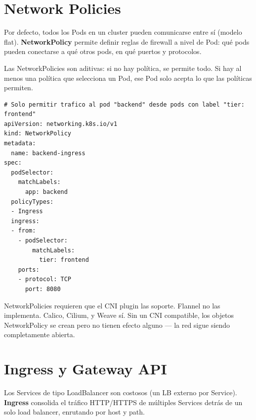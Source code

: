 \section{ Network Policies}

\begin{concepto}
Por defecto, todos los Pods en un cluster pueden comunicarse entre sí (modelo flat).
\textbf{NetworkPolicy} permite definir reglas de firewall a nivel de Pod: qué pods
pueden conectarse a qué otros pods, en qué puertos y protocolos.

Las NetworkPolicies son aditivas: si no hay política, se permite todo. Si hay al menos
una política que selecciona un Pod, ese Pod solo acepta lo que las políticas permiten.
\end{concepto}

\begin{codigo}
\begin{lstlisting}
# Solo permitir trafico al pod "backend" desde pods con label "tier: frontend"
apiVersion: networking.k8s.io/v1
kind: NetworkPolicy
metadata:
  name: backend-ingress
spec:
  podSelector:
    matchLabels:
      app: backend
  policyTypes:
  - Ingress
  ingress:
  - from:
    - podSelector:
        matchLabels:
          tier: frontend
    ports:
    - protocol: TCP
      port: 8080
\end{lstlisting}
\end{codigo}

\begin{cuidado}
NetworkPolicies requieren que el CNI plugin las soporte. Flannel no las implementa.
Calico, Cilium, y Weave sí. Sin un CNI compatible, los objetos NetworkPolicy se crean
pero no tienen efecto alguno --- la red sigue siendo completamente abierta.
\end{cuidado}

\section{ Ingress y Gateway API}

\begin{concepto}
Los Services de tipo LoadBalancer son costosos (un LB externo por Service). \textbf{Ingress}
consolida el tráfico HTTP/HTTPS de múltiples Services detrás de un solo load balancer,
enrutando por host y path.
\end{concepto}

